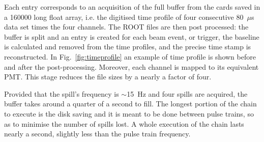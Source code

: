  Each entry corresponds to an acquisition of the full buffer from the cards saved in a 160000 long %
 float array, i.e. the digitised time profile of four consecutive 80~$\mu$s data set times the four channels.
 The ROOT files are then post processed: the buffer is split and an entry is created for each %
 beam event, or trigger, the baseline is calculated and removed from the time profiles, and the precise %
 time stamp is reconstructed.
 In Fig.~\ref{fig:timeprofile} an example of time profile is shown before and after the post-processing.
 Moreover, each channel is mapped to its equivalent PMT.
 This stage reduces the file sizes by a nearly a factor of four.

 Provided that the spill's frequency is $\sim$15~Hz and four spills are acquired, the buffer %
 takes around a quarter of a second to fill.
 The longest portion of the chain to execute is the disk saving and it is meant to be done %
 between pulse trains, so as to minimise the number of spills lost.
 A whole execution of the chain lasts nearly a second, slightly less than the pulse train frequency.

